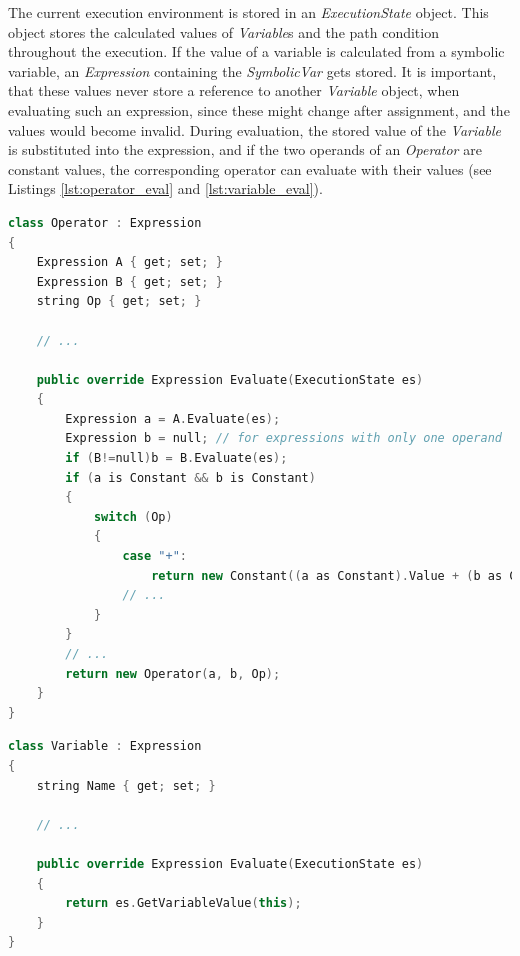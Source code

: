 The current execution environment is stored in an \textit{ExecutionState} object. This object stores the calculated values of \textit{Variable}s and the path condition throughout the execution. If the value of a variable is calculated from a symbolic variable, an \textit{Expression} containing the \textit{SymbolicVar} gets stored. It is important, that these values never store a reference to another \textit{Variable} object, when evaluating such an expression, since these might change after assignment, and the values would become invalid. During evaluation, the stored value of the \textit{Variable} is substituted into the expression, and if the two operands of an \textit{Operator} are constant values, the corresponding operator can evaluate with their values (see Listings \ref{lst:operator_eval} and \ref{lst:variable_eval}). 

\begin{lstlisting}[frame=single,escapechar=@,float=!ht,caption={Evaluation part of the Operator class},captionpos=b,label={lst:operator_eval},language=C++]
class Operator : Expression
{
    Expression A { get; set; }
    Expression B { get; set; }
    string Op { get; set; }
    
    // ...
    
    public override Expression Evaluate(ExecutionState es)
    {
        Expression a = A.Evaluate(es);
        Expression b = null; // for expressions with only one operand
        if (B!=null)b = B.Evaluate(es);
        if (a is Constant && b is Constant)
        {
            switch (Op)
            {
                case "+":
                    return new Constant((a as Constant).Value + (b as Constant).Value);
                // ...
            }
        }
        // ...
        return new Operator(a, b, Op);
    }
}
\end{lstlisting}

\begin{lstlisting}[frame=single,escapechar=@,float=!ht,caption={Evaluation part of the Variable class},captionpos=b,label={lst:variable_eval},language=C++]
class Variable : Expression
{
    string Name { get; set; }

    // ...
    
    public override Expression Evaluate(ExecutionState es)
    {
        return es.GetVariableValue(this);
    }
}
\end{lstlisting}

